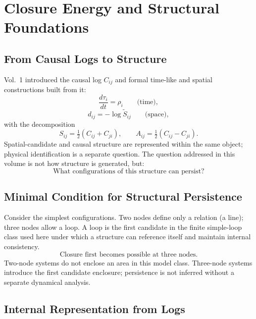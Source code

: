 \section{Closure Energy and Structural Foundations}
\label{sec:closure_energy}

\subsection{From Causal Logs to Structure}

Vol.~1 introduced the causal log $C_{ij}$ and formal time-like and spatial
constructions built from it:
\begin{equation}
  \frac{d\tau_i}{dt} = \rho_i \qquad \text{(time)},
\end{equation}
\begin{equation}
  d_{ij} = -\log \tilde{S}_{ij} \qquad \text{(space)},
\end{equation}
with the decomposition
\begin{equation}
  S_{ij} = \tfrac{1}{2}(C_{ij}+C_{ji}), \qquad
  A_{ij} = \tfrac{1}{2}(C_{ij}-C_{ji}).
\end{equation}
Spatial-candidate and causal structure are represented within the same object;
physical identification is a separate question.
The question addressed in this volume is not how structure is generated, but:
\begin{equation}
  \boxed{\text{What configurations of this structure can persist?}}
\end{equation}

\subsection{Minimal Condition for Structural Persistence}

Consider the simplest configurations.
Two nodes define only a relation (a line); three nodes allow a loop.
A loop is the first candidate in the finite simple-loop class used here under
which a structure can reference itself and maintain internal consistency.
\begin{equation}
  \boxed{\text{Closure first becomes possible at three nodes.}}
\end{equation}
Two-node systems do not enclose an area in this model class.  Three-node
systems introduce the first candidate enclosure; persistence is not inferred
without a separate dynamical analysis.

\subsection{Internal Representation from Logs}

